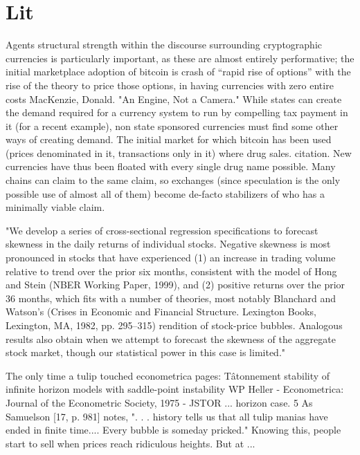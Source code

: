 \section{Lit}

Agents structural strength within the discourse surrounding cryptographic currencies is particularly important, as these are almost entirely performative; the initial marketplace adoption of bitcoin is 
crash of  %
“rapid rise of options” with the rise of the theory to price those options, in having currencies with zero entire costs
MacKenzie, Donald. "An Engine, Not a Camera."
While states can create the demand required for a currency system to run by compelling tax payment in it (for a recent example), non state sponsored currencies must find some other ways of creating demand.
The initial market for which bitcoin has been used (prices denominated in it, transactions only in it) where drug sales. citation.
New currencies have thus been floated with every single drug name possible. Many chains can claim to the same claim, so exchanges (since speculation is the only possible use of almost all of them) become de-facto stabilizers of who has a minimally viable claim. 





"We develop a series of cross-sectional regression specifications to forecast skewness in the daily returns of individual stocks. Negative skewness is most pronounced in stocks that have experienced (1) an increase in trading volume relative to trend over the prior six months, consistent with the model of Hong and Stein (NBER Working Paper, 1999), and (2) positive returns over the prior 36 months, which fits with a number of theories, most notably Blanchard and Watson's (Crises in Economic and Financial Structure. Lexington Books, Lexington, MA, 1982, pp. 295–315) rendition of stock-price bubbles. Analogous results also obtain when we attempt to forecast the skewness of the aggregate stock market, though our statistical power in this case is limited."



The only time a tulip touched econometrica pages:
Tâtonnement stability of infinite horizon models with saddle-point instability
WP Heller - Econometrica: Journal of the Econometric Society, 1975 - JSTOR
... horizon case. 5 As Samuelson [17, p. 981] notes, ". . . history tells us that all tulip
manias have ended in finite time.... Every bubble is someday pricked." Knowing this,
people start to sell when prices reach ridiculous heights. But at ... 




